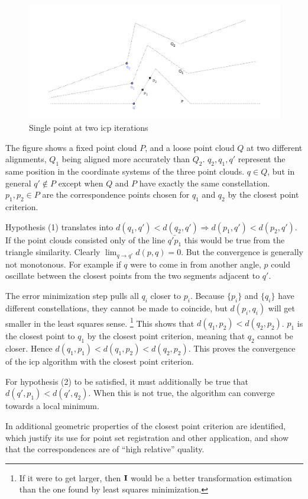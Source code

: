 \begin{figure}
\includegraphics[width=.5\textwidth]{fig/icp_true_approx_cor.pdf}
\caption{Single point at two \gls{icp} iterations}
\label{fig:icp_true_approx_cor}
\end{figure}
The figure shows a fixed point cloud $P$, and a loose point cloud $Q$ at two different alignments, $Q_1$ being aligned more accurately than $Q_2$. $q_2, q_1, q'$ represent the same position in the coordinate systems of the three point clouds. $q \in Q$, but in general $q' \notin P$ except when $Q$ and $P$ have exactly the same constellation.
$p_1, p_2 \in P$ are the correspondence points chosen for $q_1$ and $q_2$ by the closest point criterion.

Hypothesis (1) translates into $d(q_1, q') < d(q_2, q') \Rightarrow d(p_1, q') < d(p_2, q')$. If the point clouds consisted only of the line $\bar{q' p_1}$ this would be true from the triangle similarity. Clearly $\lim_{q \rightarrow q'} d(p, q) = 0$. But the convergence is generally not monotonous. For example if $q$ were to come in from another angle, $p$ could oscillate between the closest points from the two segments adjacent to $q'$.

The error minimization step pulls all $q_i$ closer to $p_i$. Because $\{ p_i \}$ and $\{ q_i \}$ have different constellations, they cannot be made to coincide, but $d(p_i, q_i)$ will get smaller in the least squares sense. \footnote{If it were to get larger, then $\mathbf{I}$ would be a better transformation estimation than the one found by least squares minimization.} This shows that $d(q_1, p_2) < d(q_2, p_2)$. $p_1$ is the closest point to $q_1$ by the closest point criterion, meaning that $q_2$ cannot be closer. Hence $d(q_1, p_1) < d(q_1, p_2) < d(q_2, p_2)$. This proves the convergence of the \gls{icp} algorithm with the closest point criterion.

For hypothesis (2) to be satisfied, it must additionally be true that $d(q', p_1) < d(q', q_2)$. When this is not true, the algorithm can converge towards a local minimum.

In \cite{Liu2008} additional geometric properties of the closest point criterion are identified, which justify its use for point set registration and other application, and show that the correspondences are of ``high relative'' quality.




